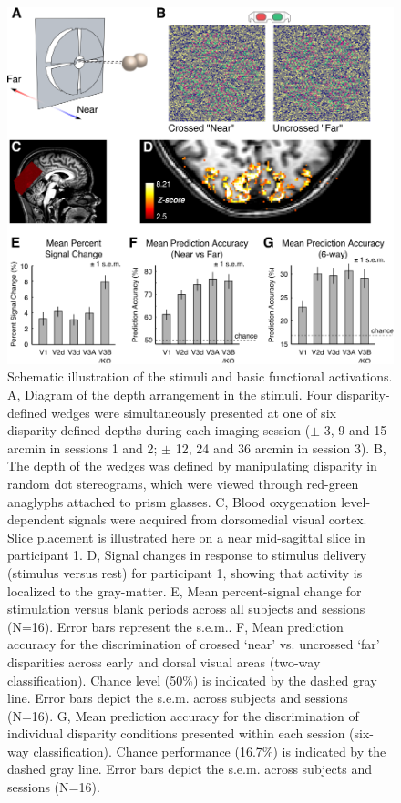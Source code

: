 \begin{figure}
  \centering
  \includegraphics[width=14cm, keepaspectratio]{fig1}
  \caption[Schematic illustration of the stimuli and basic functional activations.]{Schematic illustration of the stimuli and basic functional activations. A, Diagram of the depth arrangement in the stimuli. Four disparity-defined wedges were simultaneously presented at one of six disparity-defined depths during each imaging session ($\pm$ 3, 9 and 15 arcmin in sessions 1 and 2; $\pm$ 12, 24 and 36 arcmin in session 3). B, The depth of the wedges was defined by manipulating disparity in random dot stereograms, which were viewed through red-green anaglyphs attached to prism glasses. C, Blood oxygenation level-dependent signals were acquired from dorsomedial visual cortex. Slice placement is illustrated here on a near mid-sagittal slice in participant 1. D, Signal changes in response to stimulus delivery (stimulus versus rest) for participant 1, showing that activity is localized to the gray-matter. E, Mean percent-signal change for stimulation versus blank periods across all subjects and sessions (N=16). Error bars represent the s.e.m.. F, Mean prediction accuracy for the discrimination of crossed `near' vs. uncrossed `far' disparities across early and dorsal visual areas (two-way classification). Chance level (50\%) is indicated by the dashed gray line. Error bars depict the s.e.m. across subjects and sessions (N=16). G, Mean prediction accuracy for the discrimination of individual disparity conditions presented within each session (six-way classification). Chance performance (16.7\%) is indicated by the dashed gray line. Error bars depict the s.e.m. across subjects and sessions (N=16).}
  \label{fig:ch4fig1}
\end{figure}

